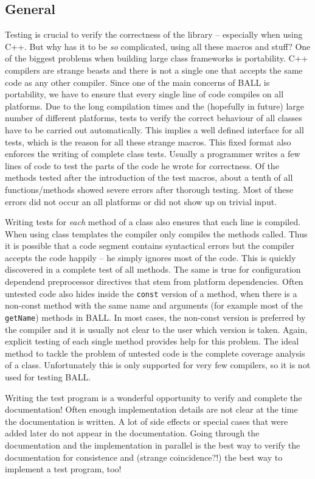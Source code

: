 \documentclass[a4paper,10pt]{article}
\begin{document}
\subsection{General}

Testing is crucial to verify the correctness of the library -- especially when
using C++. But why has it to be {\em so} complicated, using all these macros
and stuff? One of the biggest problems when building large class frameworks is
portability. C++ compilers are strange beasts and there is not a single one
that accepts the same code as any other compiler. Since one of the main
concerns of BALL is portability, we have to ensure that every single line of
code compiles on all platforms. Due to the long compilation times and the
(hopefully in future) large number of different platforms, tests to verify the
correct behaviour of all classes have to be carried out automatically. This
implies a well defined interface for all tests, which is the reason for all
these strange macros. This fixed format also enforces the writing of complete
class tests. Usually a programmer writes a few lines of code to test the parts
of the code he wrote for correctness. Of the methods tested after the
introduction of the test macros, about a tenth of all functions/methods showed
severe errors after thorough testing. Most of these errors did not occur an
all platforms or did not show up on trivial input.

Writing tests for {\em each} method of a class also ensures that each line is
compiled. When using class templates the compiler only compiles the methods
called. Thus it is possible that a code segment contains syntactical errors
but the compiler accepts the code happily -- he simply ignores most of the
code. This is quickly discovered in a complete test of all methods. The same
is true for configuration dependend preprocessor directives that stem from
platform dependencies. Often untested code also hides inside the {\tt const}
version of a method, when there is a non-const method with the same name and
arguments (for example most of the {\tt getName}) methods in BALL. In most
cases, the non-const version is preferred by the compiler and it is usually
not clear to the user which version is taken. Again, explicit testing of each
single method provides help for this problem.
The ideal method to tackle the problem of untested code is the complete
coverage analysis of a class. Unfortunately this is only supported for very
few compilers, so it is not used for testing BALL.

Writing the test program is a wonderful opportunity to verify and complete the
documentation! Often enough implementation details are not clear at the time
the documentation is written. A lot of side effects or special cases that were
added later do not appear in the documentation. Going through the
documentation and the implementation in parallel is the best way to verify the
documentation for consistence and (strange coincidence?!) the best way to
implement a test program, too!
\end{document}
